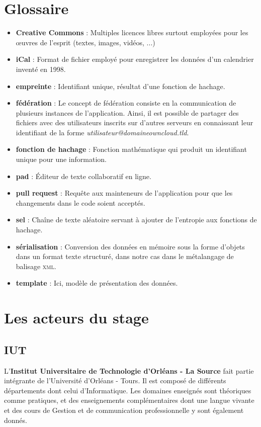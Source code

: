 \documentclass[10pt,a4paper, twoside]{report}
\newcommand{\mychapter}[2]{
	\setcounter{chapter}{#1}
	\setcounter{section}{0}
	\chapter*{#2}
	\addcontentsline{toc}{chapter}{#2}
}
\begin{document}
	\mychapter{0}{Glossaire}
	\begin{itemize}
		\item \textbf{Creative Commons} : Multiples licences libres surtout employées pour les œuvres de l'esprit (textes, images, vidéos, ...)
		\item \textbf{iCal} : Format de fichier employé pour enregistrer les données d'un calendrier inventé en 1998.
		\item \textbf{empreinte} : Identifiant unique, résultat d'une fonction de hachage.
		\item \textbf{fédération} : Le concept de fédération consiste en la communication de plusieurs instances de l'application. Ainsi, il est possible de partager des fichiers avec des utilisateurs inscrits sur d'autres serveurs en connaissant leur identifiant de la forme \textit{utilisateur@domaineowncloud.tld}.
		\item \textbf{fonction de hachage} : Fonction mathématique qui produit un identifiant unique pour une information.
		\item \textbf{pad} : Éditeur de texte collaboratif en ligne.
		\item \textbf{pull request} : Requête aux mainteneurs de l'application pour que les changements dans le code soient acceptés.
		\item \textbf{sel} : Chaîne de texte aléatoire servant à ajouter de l'entropie aux fonctions de hachage.
		\item \textbf{sérialisation} : Conversion des données en mémoire sous la forme d'objets dans un format texte structuré, dans notre cas dans le métalangage de balisage \textsc{xml}.
		\item \textbf{template} : Ici, modèle de présentation des données.
	\end{itemize}
	
	\chapter{Les acteurs du stage}
	\section{IUT}
	L'\textbf{Institut Universitaire de Technologie d'Orléans - La Source} fait partie intégrante de l'Université d'Orléans - Tours. Il est composé de différents départements dont celui d'Informatique. Les domaines enseignés sont théoriques comme pratiques, et des enseignements complémentaires dont une langue vivante et des cours de Gestion et de communication professionnelle y sont également donnés.
	
\end{document}
